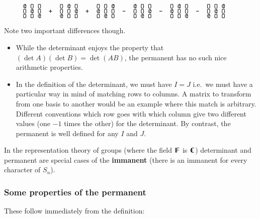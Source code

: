 \documentclass[12pt]{article}
\makeatletter
\let\S\scriptstyle
\let\SS\scriptscriptstyle
\def\sfmath#1{{\mathchoice%
{{\sf #1}}{{\sf #1}}{{\S\sf #1}}{{\SS\sf #1}}}}
\def\Stalkset#1{\sfmath{I\kern-.12em#1}}
\def\Fset{\Stalkset F}
\def\In@set{\raise.14ex\hbox{\i}\kern-.237em\raise.43ex\hbox{\i}}
\def\Roundset#1{\sfmath{\kern.14em\In@set\kern-.4em#1}}
\def\Cset{\Roundset C}
\makeatother
\begin{document}
$\hbox{\verb"     @ O O     O @ O     O O @     @ O O     O @ O     O O @"}$\\
$\hbox{\verb"     O @ O  +  O O @  +  @ O O  -  O O @  -  @ O O  -  O @ O"}$\\
$\hbox{\verb"     O O @     @ O O     O @ O     O @ O     O O @     @ O O"}$

Note two important differences though.
%
\begin{itemize}

\item While the determinant enjoys the property that $(\det A)(\det B)
      = \det(AB)$, the permanent has no such nice arithmetic properties.

\item In the definition of the determinant, we must have $I=J$ i.e.\ we must
      have a particular way in mind of matching rows to columns. A matrix
      to transform from one basis to another would be an example where this
      match is arbitrary. Different conventions which row goes with which
      column give two different values (one $-1$ times the other) for the
      determinant. By contrast, the permanent is well defined for any $I$
      and $J$.

\end{itemize}
%
In the representation theory of groups (where the field $\Fset$ is $\Cset$) determinant and permanent are special cases of the {\bf immanent} (there is an immanent for every character of $S_n$).

\clearpage
\subsubsection*{Some properties of the permanent}

These follow immediately from the definition: 
\end{document}
